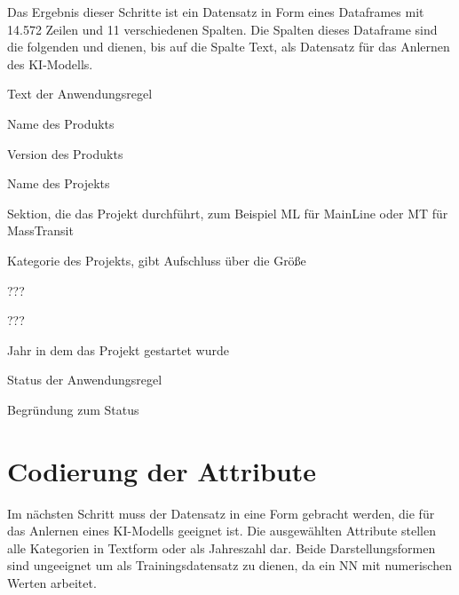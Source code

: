 Das Ergebnis dieser Schritte ist ein Datensatz in Form eines Dataframes mit 14.572 Zeilen und 11 verschiedenen Spalten. Die Spalten dieses Dataframe sind die folgenden und dienen, bis auf die 
Spalte \glqq Text\grqq{}, als Datensatz für das Anlernen des \ac{KI}-Modells.
\begin{description}[style=multiline,leftmargin=3cm,font=\bfseries, nolistsep]
    \item[Text] Text der Anwendungsregel
    \item[Product] Name des Produkts
    \item[ProductVersion] Version des Produkts
    \item[Project\_name] Name des Projekts
    \item[section] Sektion, die das Projekt durchführt, zum Beispiel ML für MainLine oder MT für MassTransit
    \item[Project\_category] Kategorie des Projekts, gibt Aufschluss über die Größe
    \item[BS] ???
    \item[RU] ???
    \item[ProjectYear] Jahr in dem das Projekt gestartet wurde
    \item[Status] Status der Anwendungsregel
    \item[Statement] Begründung zum Status
\end{description} 

\section{Codierung der Attribute}
Im nächsten Schritt muss der Datensatz in eine Form gebracht werden, die für das Anlernen eines \ac{KI}-Modells geeignet ist. Die ausgewählten Attribute stellen alle Kategorien in 
Textform oder als Jahreszahl dar. Beide Darstellungsformen sind ungeeignet um als Trainingsdatensatz zu dienen, da ein \ac{NN} mit numerischen Werten arbeitet.